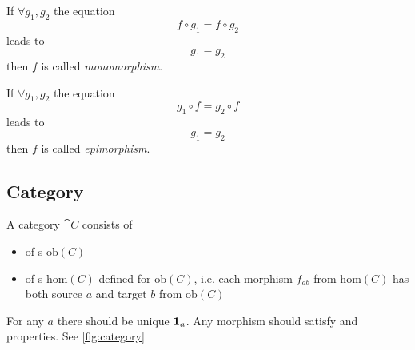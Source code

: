 \begin{definition}[Monomorphism]
  \label{def:monomorphism}
  If $\forall g_1, g_2$ the equation 
  \[
  f \circ g_1 = f \circ g_2
  \]
  leads to 
  \[
  g_1 = g_2
  \]
  then $f$ is called \textit{monomorphism}.
\end{definition}

\begin{definition}[Epimorphism]
  \label{def:epimorphism}
  If $\forall g_1, g_2$ the equation 
  \[
  g_1 \circ f = g_2 \circ f
  \]
  leads to 
  \[
  g_1 = g_2
  \]
  then $f$ is called \textit{epimorphism}.
\end{definition}


\subsection{Category}

\begin{definition}[Category]
  \label{def:category}
  A category $\cat{C}$ consists of 
  \begin{itemize}
  \item {} of
    s $\mathrm{ob}(C)$
  \item {} of s $\mathrm{hom}(C)$
    defined for $\mathrm{ob}(C)$, i.e. each morphism $f_{ab}$ from 
    $\mathrm{hom}(C)$ has both source
    $a$ and target $b$ from $\mathrm{ob}(C)$
  \end{itemize}
  For any  $a$ there should be unique
   $\idarrow[a]$. Any morphism should satisfy
   and 
  properties. See \cref{fig:category}  
\end{definition}

